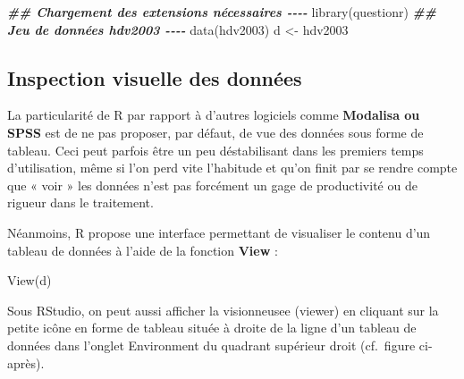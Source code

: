 \documentclass[
]{book}
\newenvironment{Shaded}{\begin{snugshade}}{\end{snugshade}}
\newcommand{\DocumentationTok}[1]{\textcolor[rgb]{0.56,0.35,0.01}{\textbf{\textit{#1}}}}
\newcommand{\FunctionTok}[1]{\textcolor[rgb]{0.00,0.00,0.00}{#1}}
\newcommand{\NormalTok}[1]{#1}
\newcommand{\OtherTok}[1]{\textcolor[rgb]{0.56,0.35,0.01}{#1}}
\begin{document}
\begin{Shaded}
\begin{Highlighting}[]
\DocumentationTok{\#\# Chargement des extensions nécessaires {-}{-}{-}{-}}
\FunctionTok{library}\NormalTok{(questionr)}
\DocumentationTok{\#\# Jeu de données hdv2003 {-}{-}{-}{-}}
\FunctionTok{data}\NormalTok{(hdv2003)}
\NormalTok{d }\OtherTok{\textless{}{-}}\NormalTok{ hdv2003}
\end{Highlighting}
\end{Shaded}

\hypertarget{inspection-visuelle-des-donnuxe9es}{%
\subsection{Inspection visuelle des données}\label{inspection-visuelle-des-donnuxe9es}}

La particularité de R par rapport à d'autres logiciels comme \textbf{Modalisa ou SPSS} est de ne pas proposer, par défaut, de vue des données sous forme de tableau. Ceci peut parfois être un peu déstabilisant dans les premiers temps d'utilisation, même si l'on perd vite l'habitude et qu'on finit par se rendre compte que « voir » les données n'est pas forcément un gage de productivité ou de rigueur dans le traitement.

Néanmoins, R propose une interface permettant de visualiser le contenu d'un tableau de données à l'aide de la fonction \textbf{View} :

\begin{Shaded}
\begin{Highlighting}[]
\FunctionTok{View}\NormalTok{(d)}
\end{Highlighting}
\end{Shaded}

Sous RStudio, on peut aussi afficher la visionneusee (viewer) en cliquant sur la petite icône en forme de tableau située à droite de la ligne d'un tableau de données dans l'onglet Environment du quadrant supérieur droit (cf.~figure ci-après).
\end{document}
